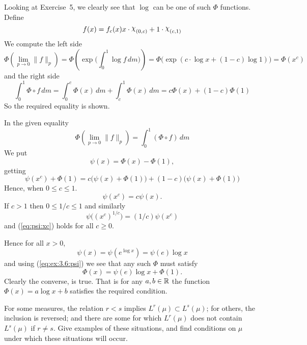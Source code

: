 \begin{enumerate}
Looking at Exercise~5, we clearly see that \(\log\) can be
one of such \(\Phi\) functions.
Define
\begin{equation*} %
 f(x) = f_c(x) x\cdot\chhi_{(0,c)} + 1\cdot \chhi_{(c,1)}
\end{equation*}
We compute the left side
\begin{equation*}
\Phi\left( \lim_{p\to 0} \|f\|_p\right)
= \Phi\left( \exp \bigl(\int_0^1 \log f\,dm\bigr)\right)
= \Phi\bigl( \exp (c\cdot\log x + (1-c)\log 1)\bigr)
= \Phi(x^c)
\end{equation*}
and the right side
\begin{equation*}
 \int_0^1 \Phi\circ f \,dm
 = \int_0^c \Phi(x)\,dm + \int_c^1 \Phi(x)\,dm
 = c\Phi(x) + (1-c)\Phi(1)
\end{equation*}
So the required equality is shown.

In the given equality
\begin{equation} \label{eq:Phi:lim}
 \Phi(\lim_{p\to 0} \|f\|_p) = \int_0^1(\Phi\circ f)\,dm
\end{equation}
We put
\begin{equation} \label{eq:ex:3.6:psi}
\psi(x) = \Phi(x) - \Phi(1),
\end{equation}
 getting
\begin{equation*}
 \psi(x^c)+\Phi(1)
  = c\bigl(\psi(x)+\Phi(1)\bigr) + (1-c)\bigl(\psi(x)+\Phi(1)\bigr)
\end{equation*}
Hence, when \(0\leq c\leq 1\).
\begin{equation} \label{eq:psi:xc}
\psi(x^c) = c\psi(x).
\end{equation}
If \(c>1\) then \(0\leq 1/c\leq 1\) and similarly
\begin{equation*}
\psi\bigl((x^c)^{1/c}\bigr) = (1/c)\psi(x^c)
\end{equation*}
and (\ref{eq:psi:xc}) holds for all \(c\geq 0\).

Hence for all \(x>0\),
\begin{equation*}
 \psi(x) = \psi\left(e^{\log x}\right) = \psi(e)\log x
\end{equation*}
and using (\ref{eq:ex:3.6:psi}) we see that any such \(\Phi\) must satisfy
\begin{equation*}
\Phi(x) = \psi(e)\log x + \Phi(1).
\end{equation*}
Clearly the converse, is true. That is for any \(a,b\in\mathbb{R}\)
the function \(\Phi(x) = a\log x + b\) satisfies the required condition.


\begin{excopy}
For some measures, the relation \(r<s\) implies
\(L^r(\mu) \subset L^s(\mu)\);
for others, the inclusion is reversed;
and there are some for which \(L^r(\mu)\) does not contain \(L^s(\mu)\)
if \(r\neq s\). Give examples of these situations, and find conditions
on \(\mu\) under which these situations will occur.
\end{excopy}


\end{enumerate}
